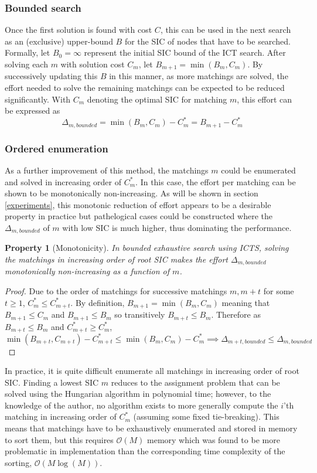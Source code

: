 \documentclass[english]{article}
\newtheorem{property}{Property}
\begin{document}
	\subsubsection{Bounded search}
	Once the first solution is found with cost $C$, this can be used in the next search as an (exclusive) upper-bound $B$ for the SIC of nodes that have to be searched. Formally, let $B_0 = \infty$ represent the initial SIC bound of the ICT search. After solving each $m$ with solution cost $C_m$, let $B_{m+1} = \min(B_m,C_m)$. By successively updating this $B$ in this manner, as more matchings are solved, the effort needed to solve the remaining matchings can be expected to be reduced significantly. With $C_m$ denoting the optimal SIC for matching $m$, this effort can be expressed as	
	\[\Delta_{m,bounded} = \min(B_m,C_m) - C^*_m = B_{m+1} - C^*_m\]
	\subsubsection{Ordered enumeration}
	As a further improvement of this method, the matchings $m$ could be enumerated and solved in increasing order of $C^*_m$. In this case, the effort per matching can be shown to be monotonically non-increasing. As will be shown in section \ref{experiments}, this monotonic reduction of effort appears to be a desirable property in practice but pathelogical cases could be constructed where the $\Delta_{m,bounded}$ of $m$ with low SIC is much higher, thus dominating the performance.
	\begin{property}[Monotonicity]
		In bounded exhaustive search using ICTS, solving the matchings in increasing order of root SIC makes the effort $\Delta_{m,bounded}$ monotonically non-increasing as a function of $m$.
	\end{property}
	\begin{proof}
		Due to the order of matchings for successive matchings $m,m+t$ for some $t\geq 1$, $C^*_{m} \leq C^*_{m+t}$. By definition, $B_{m+1} = \min(B_m,C_m)$ meaning that $B_{m+1} \leq C_m$ and $B_{m+1} \leq B_m$ so transitively $B_{m+t} \leq B_m$. Therefore as $B_{m+t} \leq B_m$ and $C^*_{m+t} \geq C^*_{m}$,
		\[\min(B_{m+t},C_{m+t}) - C^*_{m+t}\leq \min(B_m,C_m) - C^*_m\implies \Delta_{m+t,bounded} \leq \Delta_{m,bounded}\]
	\end{proof}
	In practice, it is quite difficult enumerate all matchings in increasing order of root SIC. Finding a lowest SIC $m$ reduces to the assignment problem that can be solved using the Hungarian algorithm \cite{kuhn55} in polynomial time; however, to the knowledge of the author, no algorithm exists to more generally compute the $i$'th matching in increasing order of $C^*_m$ (assuming some fixed tie-breaking). This means that matchings have to be exhaustively enumerated and stored in memory to sort them, but this requires $\mathcal{O}(M)$ memory which was found to be more problematic in implementation than the corresponding time complexity of the sorting, $\mathcal{O}(M\log(M))$.
	
\end{document}
